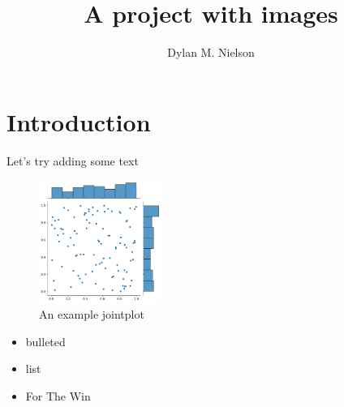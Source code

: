 \documentclass{article}
\title{A project with images}
\author{Dylan M. Nielson}
\date{}
\begin{document}
\maketitle

\section{Introduction}
Let's try adding some text
\begin{figure}[htp]
    \centering
    \includegraphics[width=4cm]{fig1.jpg}
    \caption{An example jointplot}
    \label{fig:jp}
\end{figure}
\begin{itemize}
    \item bulleted
    \item list
    \item For The Win
\end{itemize}
\end{document}
